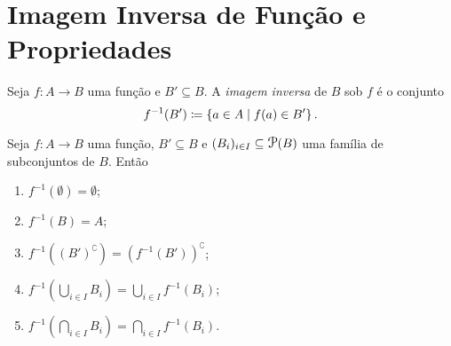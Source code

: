 \section{Imagem Inversa de Função e Propriedades}

\begin{defi}
	Seja $f: A \to B$ uma função e $B' \subseteq B$. A \emph{imagem inversa} de $B$ sob $f$ é o conjunto
	\begin{equation*}
	f^{-1}(B') \coloneqq \left\{a \in A \;\middle\vert\; f(a) \in B' \right\}.
	\end{equation*}
\end{defi}

\begin{prop}
\label{prop:props.imag.inv}
	Seja $f: A \to B$ uma função, $B' \subseteq B$ e $(B_i)_{i \in I} \subseteq \p(B)$ uma família de subconjuntos de $B$. Então
	\begin{enumerate}
	\item $f^{-1}(\emptyset) = \emptyset$;
	\item $f^{-1}(B) = A$;
	\item $f^{-1}\left((B')^\complement\right) = (f^{-1}(B'))^\complement$;
	\item $f^{-1}\left(\displaystyle\bigcup_{i \in I} B_i\right) = \displaystyle\bigcup_{i \in I} f^{-1}(B_i)$;
	\item $f^{-1}\left(\displaystyle\bigcap_{i \in I} B_i\right) = \displaystyle\bigcap_{i \in I} f^{-1}(B_i)$.
	\end{enumerate}
\end{prop}
